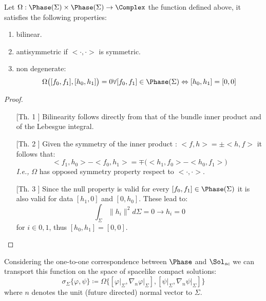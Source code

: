 \documentclass[Main]{subfiles}
\begin{document}
			\begin{proposition}
				Let  $\Omega: \Phase(\Sigma) \times \Phase(\Sigma) \rightarrow \Complex $ the function defined above, it satisfies the following properties:
				\begin{enumerate}
					\item bilinear.
					\item antisymmetric if $<\cdot, \cdot>$ is symmetric.
					\item non degenerate:
						\begin{displaymath}
							\Omega\big( [f_0,f_1], [h_0,h_1] \big) =0 \forall [f_0,f_1]\in \Phase(\Sigma) \Leftrightarrow [h_0,h_1] =[0,0]
						\end{displaymath}
				\end{enumerate}								
			\end{proposition}
			\begin{proof}
				\begin{itemize}
					\item[[Th. 1]]
						Bilinearity follows directly from that of the bundle inner product and %
						of the Lebesgue integral.

					\item[[Th. 2]]
						Given the symmetry of the inner product : $ <f,h> = \pm <h,f>$ it  follows that:
						\begin{displaymath}
							<f_1,h_0> -<f_0,h_1> = \mp \big( <h_1,f_0> - <h_0,f_1> \big)
						\end{displaymath}
						\textit{I.e.,} $\Omega$ has opposed symmetry property respect to $<\cdot,\cdot>$.
					
					\item[[Th. 3]]
						Since the null property is valid for every $[f_0,f_1]\in \Phase(\Sigma)$ it is also valid for data $[h_1,0]$ and $[0,h_0]$.
						These lead to:%
						\begin{displaymath}
							\int_\Sigma \parallel h_i \parallel^2 d\Sigma = 0 \rightarrow h_i = 0 
						\end{displaymath}
						for $i \in {0,1}$, thus $[h_0,h_1] = [0,0]$.
				\end{itemize}
			\end{proof}

			Considering the one-to-one correspondence between $\Phase$ and $\Sol_{sc}$ we can transport this function on the space of spacelike compact solutions:
			\begin{displaymath}
				\sigma_\Sigma \big\{ \varphi, \psi \big\} \coloneqq 
				\Omega \big\{ [\varphi\vert_\Sigma, \nabla_n\varphi\vert_\Sigma] ,[\psi\vert_\Sigma,\nabla_n\psi\vert_\Sigma] \big\}
			\end{displaymath}				
			where $n$ denotes the unit (future directed) normal vector to $\Sigma$.
				
\end{document}
